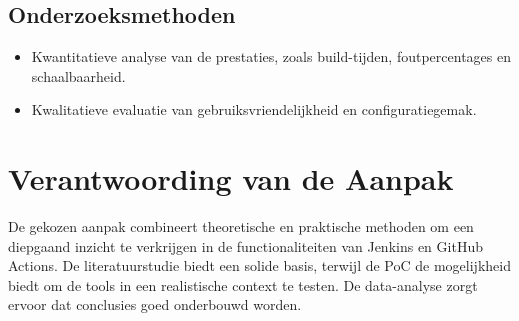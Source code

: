 \subsection*{Onderzoeksmethoden}
\begin{itemize}
    \item Kwantitatieve analyse van de prestaties, zoals build-tijden, foutpercentages en schaalbaarheid.
    \item Kwalitatieve evaluatie van gebruiksvriendelijkheid en configuratiegemak.
\end{itemize}

\section{Verantwoording van de Aanpak}
De gekozen aanpak combineert theoretische en praktische methoden om een diepgaand inzicht te verkrijgen in de functionaliteiten van Jenkins en GitHub Actions. De literatuurstudie biedt een solide basis, terwijl de PoC de mogelijkheid biedt om de tools in een realistische context te testen. De data-analyse zorgt ervoor dat conclusies goed onderbouwd worden.






